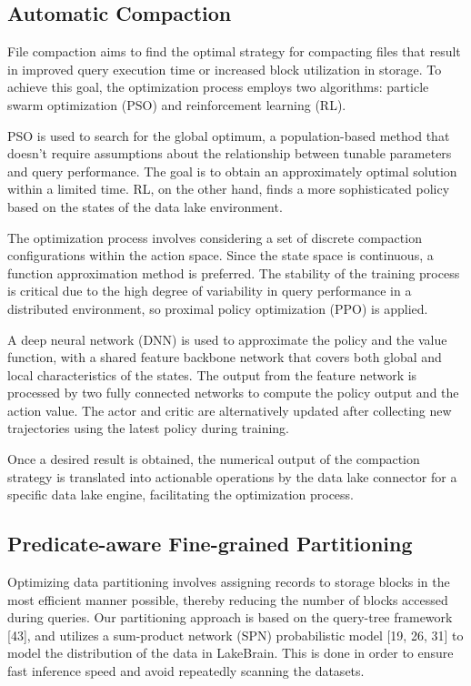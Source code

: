 \subsection{Automatic Compaction}

File compaction aims to find the optimal strategy for compacting files that result in improved query execution time or increased block utilization in storage. To achieve this goal, the optimization process employs two algorithms: particle swarm optimization (PSO) and reinforcement learning (RL).

PSO is used to search for the global optimum, a population-based method that doesn't require assumptions about the relationship between tunable parameters and query performance. The goal is to obtain an approximately optimal solution within a limited time. RL, on the other hand, finds a more sophisticated policy based on the states of the data lake environment.

The optimization process involves considering a set of discrete compaction configurations within the action space. Since the state space is continuous, a function approximation method is preferred. The stability of the training process is critical due to the high degree of variability in query performance in a distributed environment, so proximal policy optimization (PPO) is applied.

A deep neural network (DNN) is used to approximate the policy and the value function, with a shared feature backbone network that covers both global and local characteristics of the states. The output from the feature network is processed by two fully connected networks to compute the policy output and the action value. The actor and critic are alternatively updated after collecting new trajectories using the latest policy during training.

Once a desired result is obtained, the numerical output of the compaction strategy is translated into actionable operations by the data lake connector for a specific data lake engine, facilitating the optimization process.


\subsection{Predicate-aware Fine-grained Partitioning}

Optimizing data partitioning involves assigning records to storage blocks in the most efficient manner possible, thereby reducing the number of blocks accessed during queries. Our partitioning approach is based on the query-tree framework [43], and utilizes a sum-product network (SPN) probabilistic model [19, 26, 31] to model the distribution of the data in LakeBrain. This is done in order to ensure fast inference speed and avoid repeatedly scanning the datasets.

